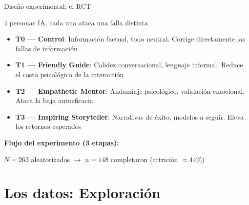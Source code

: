 \documentclass[aspectratio=169, 11pt]{beamer}
\begin{document}
\begin{frame}{Diseño experimental: el RCT}
\begin{block}{4 personas IA, cada una ataca una falla distinta}
\small
\begin{itemize}\setlength{\itemsep}{2pt}
  \item \textbf{T0 --- Control}: Información factual, tono neutral. Corrige directamente las fallas de información
  \item \textbf{T1 --- Friendly Guide}: Calidez conversacional, lenguaje informal. Reduce el costo psicológico de la interacción
  \item \textbf{T2 --- Empathetic Mentor}: Andamiaje psicológico, validación emocional. Ataca la baja autoeficacia
  \item \textbf{T3 --- Inspiring Storyteller}: Narrativas de éxito, modelos a seguir. Eleva los retornos esperados
\end{itemize}
\end{block}

\vspace{0.2cm}
\textbf{Flujo del experimento (3 etapas):}

\medskip
\centering
{}

\vspace{0.2cm}
{\small $N = 263$ aleatorizados $\rightarrow$ $n = 148$ completaron (attrición $\approx 44\%$)}
\end{frame}

\section{Los datos: Exploración}
\end{document}

